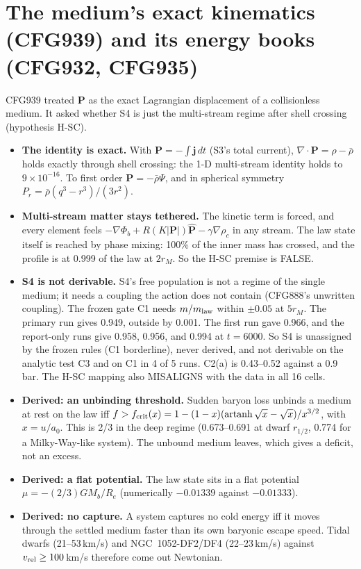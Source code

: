 \documentclass[10pt]{article}
\begin{document}
\section{The medium's exact kinematics (CFG939) and its energy books (CFG932, CFG935)}
CFG939 treated $\mathbf P$ as the exact Lagrangian displacement of a collisionless medium. It asked whether S4 is just the multi-stream regime after shell crossing (hypothesis H-SC).
\begin{itemize}
\item \textbf{The identity is exact.} With $\mathbf P=-\int\mathbf j\,dt$ (S3's total current), $\nabla\cdot\mathbf P=\rho-\bar\rho$ holds exactly through shell crossing: the 1-D multi-stream identity holds to $9\times10^{-16}$. To first order $\mathbf P=-\bar\rho\Psi$, and in spherical symmetry $P_r=\bar\rho(q^3-r^3)/(3r^2)$.
\item \textbf{Multi-stream matter stays tethered.} The kinetic term is forced, and every element feels $-\nabla\Phi_b+R(K|\mathbf P|)\hat{\mathbf P}-\gamma\nabla\rho_c$ in any stream. The law state itself is reached by phase mixing: 100\% of the inner mass has crossed, and the profile is at 0.999 of the law at $2r_M$. So the H-SC premise is FALSE.
\item \textbf{S4 is not derivable.} S4's free population is not a regime of the single medium; it needs a coupling the action does not contain (CFG888's unwritten coupling). The frozen gate C1 needs $m/m_{\rm law}$ within $\pm0.05$ at $5r_M$. The primary run gives 0.949, outside by 0.001. The first run gave 0.966, and the report-only runs give 0.958, 0.956, and 0.994 at $t=6000$. So S4 is unassigned by the frozen rules (C1 borderline), never derived, and not derivable on the analytic test C3 and on C1 in 4 of 5 runs. C2(a) is 0.43--0.52 against a 0.9 bar. The H-SC mapping also MISALIGNS with the data in all 16 cells.
\item \textbf{Derived: an unbinding threshold.} Sudden baryon loss unbinds a medium at rest on the law iff $f>f_{\rm crit}(x)=1-(1-x)(\operatorname{artanh}\sqrt x-\sqrt x)/x^{3/2}$, with $x=u/a_0$. This is 2/3 in the deep regime (0.673--0.691 at dwarf $r_{1/2}$, 0.774 for a Milky-Way-like system). The unbound medium leaves, which gives a deficit, not an excess.
\item \textbf{Derived: a flat potential.} The law state sits in a flat potential $\mu=-(2/3)GM_b/R_e$ (numerically $-0.01339$ against $-0.01333$).
\item \textbf{Derived: no capture.} A system captures no cold energy iff it moves through the settled medium faster than its own baryonic escape speed. Tidal dwarfs (21--53\,km/s) and NGC~1052-DF2/DF4 (22--23\,km/s) against $v_{\rm rel}\ge100$\,km/s therefore come out Newtonian.

\end{itemize}
\end{document}
